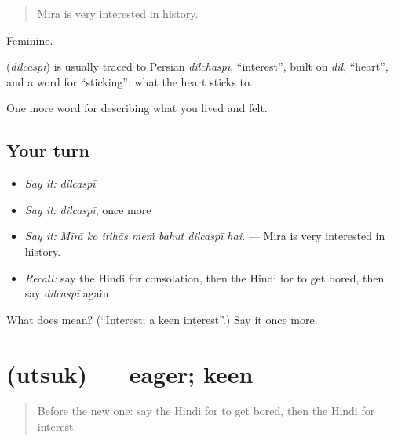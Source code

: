 \begin{quote}
Mira is very interested in history.
\end{quote}

Feminine.

\begin{cousinweb}
\textbf{} (\emph{dilcaspī}) is usually traced to Persian \emph{dilchaspī}, \textquotedblleft{}interest\textquotedblright{}, built on \emph{dil}, \textquotedblleft{}heart\textquotedblright{}, and a word for \textquotedblleft{}sticking\textquotedblright{}: what the heart sticks to.
\end{cousinweb}

\begin{grammarlens}[title={What you've built}]
One more word for describing what you lived and felt.
\end{grammarlens}

\subsection*{Your turn}
\begin{itemize}
\raggedright
  \item \emph{Say it:} \emph{dilcaspī}
  \item \emph{Say it:} \emph{dilcaspī}, once more
  \item \emph{Say it:} \emph{Mīrā ko itihās meṁ bahut dilcaspī hai.} — Mira is very interested in history.
  \item \emph{Recall:} say the Hindi for consolation, then the Hindi for to get bored, then say \emph{dilcaspī} again
\end{itemize}

\begin{tcolorbox}[breakable,colback=teal!4,colframe=teal!35!black,title={Before you move on}]
What does  mean? (\textquotedblleft{}Interest; a keen interest\textquotedblright{}.) Say it once more.
\end{tcolorbox}
\section[\texorpdfstring{\hi{उत्सुक} (utsuk)}{उत्सुक (utsuk)}]{ (utsuk) — eager; keen}

\label{lesson:HI-C464-utsuk}



\begin{quote}
Before the new one: say the Hindi for to get bored, then the Hindi for interest.
\end{quote}


